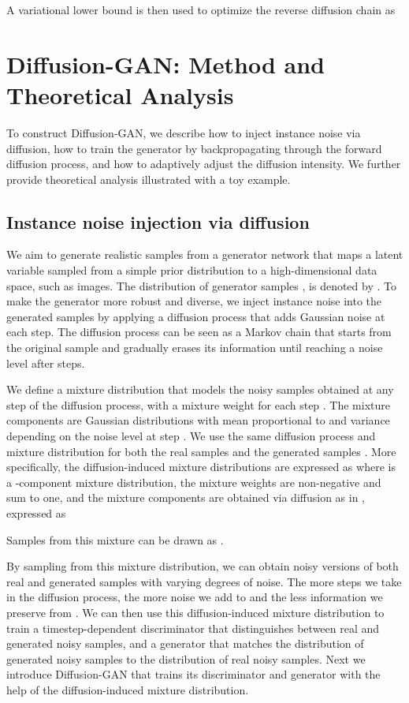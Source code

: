 \documentclass{article} \usepackage{iclr2023_conference,times}
\theoremstyle{plain}
\theoremstyle{definition}
\theoremstyle{remark}
\begin{document}
A variational lower bound \citep{blei2017variational} is then used to optimize 
the reverse diffusion chain as 


\section{Diffusion-GAN: Method and Theoretical Analysis}\label{sec:methodology}

\label{sec:method}


To construct Diffusion-GAN, we describe how to inject instance noise via diffusion, how to train the generator by backpropagating through the forward diffusion process, and how to adaptively adjust the diffusion intensity. We further provide theoretical analysis illustrated with a toy example.  
\subsection{Instance noise injection via diffusion} 

We aim to generate realistic samples  from a generator network  that maps a latent variable  sampled from a simple prior distribution  to a high-dimensional data space, such as images. The distribution of generator samples  ,  is denoted by . To make the generator more robust and diverse, we inject instance noise into the generated samples  by applying a diffusion process that adds Gaussian noise at each step. The diffusion process can be seen as a Markov chain that starts from the original sample  and gradually erases its information until reaching a noise level  after  steps. 


We define a mixture distribution  that models the noisy samples  obtained at any step of the diffusion process, with a mixture weight  for each step . The mixture components  are Gaussian distributions with mean proportional to  and variance depending on the noise level at step . We use the same diffusion process and mixture distribution for both the real samples  and the generated samples . More specifically, the diffusion-induced mixture distributions are expressed as 
where   is a -component mixture distribution, the mixture weights  are non-negative and sum to one, and the mixture components  are obtained via diffusion as in  , expressed as

Samples from this mixture can be drawn as . 

By sampling  from this mixture distribution, we can obtain noisy versions of both real and generated samples with varying degrees of noise. The more steps we take in the diffusion process, the more noise we add to  and the less information we preserve from . We can then use this diffusion-induced mixture distribution to train a timestep-dependent discriminator  that distinguishes between real and generated noisy samples, and a generator  that matches the distribution of generated noisy samples to the distribution of real noisy samples. Next we introduce Diffusion-GAN that trains its discriminator and generator with the help of the diffusion-induced mixture distribution.
\end{document}
